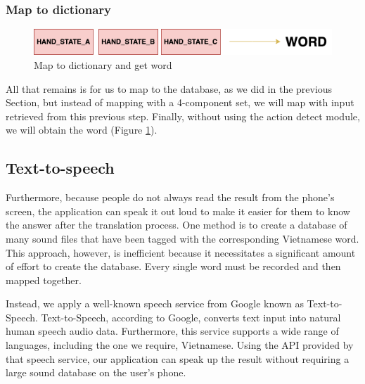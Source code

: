 
      
      
    \subsubsection{ Map to dictionary }

      \begin{figure}[H]
        \centering
        \includegraphics[width=\textwidth]{img/Chap4/Result.png}
        \caption{ Map to dictionary and get word }
        \label{fig:Chap4-Result}
      \end{figure}


All that remains is for us to map to the database, as we did in the previous Section, but instead of mapping with a 4-component set, we will map with input retrieved from this previous step. Finally, without using the action detect module, we will obtain the word (Figure \ref{fig:Chap4-Result}).

\subsection{Text-to-speech}

Furthermore, because people do not always read the result from the phone's screen, the application can speak it out loud to make it easier for them to know the answer after the translation process. One method is to create a database of many sound files that have been tagged with the corresponding Vietnamese word. This approach, however, is inefficient because it necessitates a significant amount of effort to create the database. Every single word must be recorded and then mapped together.

Instead, we apply a well-known speech service from Google known as Text-to-Speech\cite{GG:Text-to-Speech}. Text-to-Speech, according to Google, converts text input into natural human speech audio data. Furthermore, this service supports a wide range of languages, including the one we require, Vietnamese. Using the API provided by that speech service, our application can speak up the result without requiring a large sound database on the user's phone.

